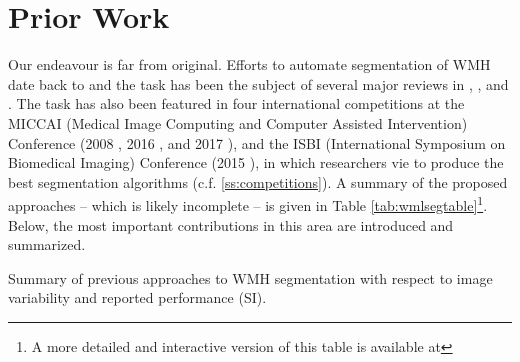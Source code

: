 \section{Prior Work}
Our endeavour is far from original. Efforts to automate segmentation of WMH date back to \citeyear{Kapouleas1990} \cite{Kapouleas1990} and the task has been the subject of several major reviews in \citeyear{Llado2012} \cite{Llado2012}, \citeyear{Garcia-Lorenzo2013} \cite{Garcia-Lorenzo2013}, and \citeyear{Caligiuri2015} \cite{Caligiuri2015}. The task has also been featured in four international competitions at the MICCAI (Medical Image Computing and Computer Assisted Intervention) Conference (2008 \cite{MSSEG2008}, 2016 \cite{MSSEG2016}, and 2017 \cite{WMHSEG2017}), and the ISBI (International Symposium on Biomedical Imaging) Conference (2015 \cite{MSISBI2015}), in which researchers vie to produce the best segmentation algorithms (c.f. \ref{ss:competitions}). A summary of the proposed approaches -- which is likely incomplete -- is given in Table \ref{tab:wmlsegtable}\footnote{A more detailed and interactive version of this table is available at }. Below, the most important contributions in this area are introduced and summarized.
\begin{table}
  \caption{Summary of previous approaches to WMH segmentation with respect to image variability and reported performance (SI).}
  \footnotesize{\centering{}}
  \label{tab:wmlsegtable}
\end{table}
